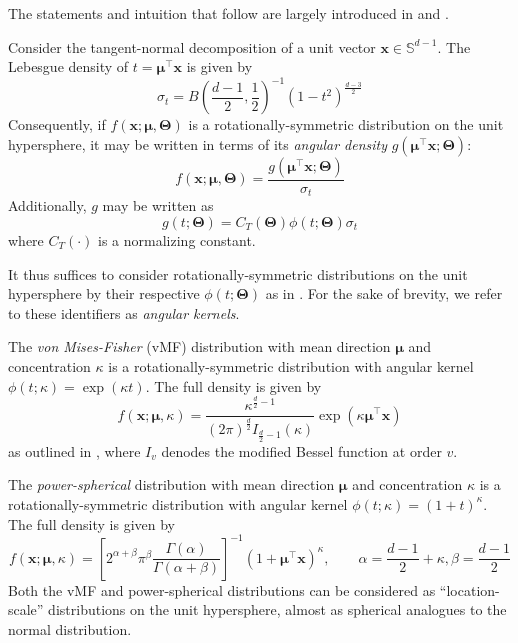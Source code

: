 The statements and intuition that follow are largely introduced in \cite{decao2020powersphericaldistribution} and
\cite{mardia2009directional}.
\begin{theorem}
\label{thm:marginal}
Consider the tangent-normal decomposition of a unit vector $\mathbf{x} \in \mathbb{S}^{d - 1}$. The Lebesgue density of
$t = \boldsymbol{\mu}^\top\mathbf{x}$ is given by
\[
    \sigma_t = B\left(\frac{d - 1}{2}, \frac{1}{2}\right)^{-1}\left(1 - t^2\right)^{\frac{d - 3}{2}}
\]
Consequently, if $f(\mathbf{x}; \boldsymbol{\mu}, \boldsymbol{\Theta})$ is a rotationally-symmetric distribution on the
unit hypersphere, it may be written in terms of its \textit{angular density} \citep{Garc_a_Portugu_s_2019} $g\left(\boldsymbol{\mu}^\top\mathbf{x}; \boldsymbol{\Theta}\right)$:
\[
    f(\mathbf{x}; \boldsymbol{\mu}, \boldsymbol{\Theta}) = \frac{g\left(\boldsymbol{\mu}^\top\mathbf{x}; \boldsymbol{\Theta}\right)}{\sigma_t}
\]
Additionally, $g$ may be written as
\[
    g\left(t; \boldsymbol{\Theta}\right) = C_T(\boldsymbol{\Theta})\phi(t; \boldsymbol{\Theta})\sigma_t
\]
where $C_T(\cdot)$ is a normalizing constant.
\end{theorem}
It thus suffices to consider rotationally-symmetric distributions on the unit hypersphere by their respective $\phi(t; \boldsymbol{\Theta})$ as
in . For the sake of brevity, we refer to these identifiers as \textit{angular kernels}.
\begin{example}
The \textit{von Mises-Fisher} (vMF) distribution with mean direction $\boldsymbol{\mu}$ and concentration $\kappa$ is a
rotationally-symmetric distribution with angular kernel $\phi(t; \kappa) = \exp(\kappa t)$. The full density is given by
\[
    f(\mathbf{x}; \boldsymbol{\mu}, \kappa) = \frac{\kappa^{\frac{d}{2} - 1}}{(2\pi)^{\frac{d}{2}}I_{\frac{d}{2} - 1}(\kappa)}\exp\left(\kappa\boldsymbol{\mu}^\top\mathbf{x}\right)
\]
as outlined in \cite{davidson2022hypersphericalvariationalautoencoders}, where $I_v$ denodes the modified Bessel function at
order $v$.
\end{example}
\begin{example}
The \textit{power-spherical} distribution \citep{decao2020powersphericaldistribution} with mean direction $\boldsymbol{\mu}$ and concentration $\kappa$ is a
rotationally-symmetric distribution with angular kernel $\phi(t; \kappa) = (1 + t)^\kappa$. The full density is given by
\[
    f(\mathbf{x}; \boldsymbol{\mu}, \kappa) = \left[ 2^{\alpha + \beta}\pi^\beta \frac{\Gamma(\alpha)}{\Gamma(\alpha + \beta)} \right]^{-1}\left(1 + \boldsymbol{\mu}^\top\mathbf{x}\right)^\kappa, \qquad \alpha = \frac{d - 1}{2} + \kappa, \beta = \frac{d - 1}{2}
\]
Both the vMF and power-spherical distributions can be considered as ``location-scale'' distributions on the unit
hypersphere, almost as spherical analogues to the normal distribution. 
\end{example}
